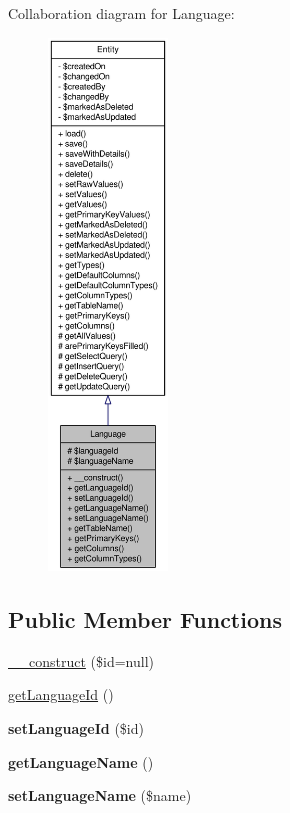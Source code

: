 Collaboration diagram for Language:\nopagebreak
\begin{figure}[H]
\begin{center}
\leavevmode
\includegraphics[height=400pt]{classLanguage__coll__graph}
\end{center}
\end{figure}
\subsection*{Public Member Functions}
\begin{DoxyCompactItemize}
\item 
\hyperlink{classLanguage_abc1d723ee7724d0b7a6b27914e8e6d55}{\_\-\_\-construct} (\$id=null)
\item 
\hyperlink{classLanguage_ae8b3c5092853212ca93c29c3af395326}{getLanguageId} ()
\item 
\hypertarget{classLanguage_a367ceec7d9d2c011c15c5e296d8188a0}{
{\bfseries setLanguageId} (\$id)}
\label{classLanguage_a367ceec7d9d2c011c15c5e296d8188a0}

\item 
\hypertarget{classLanguage_a4db7f3dd4e44138175adc1d6447e7f6f}{
{\bfseries getLanguageName} ()}
\label{classLanguage_a4db7f3dd4e44138175adc1d6447e7f6f}

\item 
\hypertarget{classLanguage_afa72381cb58b086ff6bcc08c4fbe582f}{
{\bfseries setLanguageName} (\$name)}
\label{classLanguage_afa72381cb58b086ff6bcc08c4fbe582f}

\end{DoxyCompactItemize}
